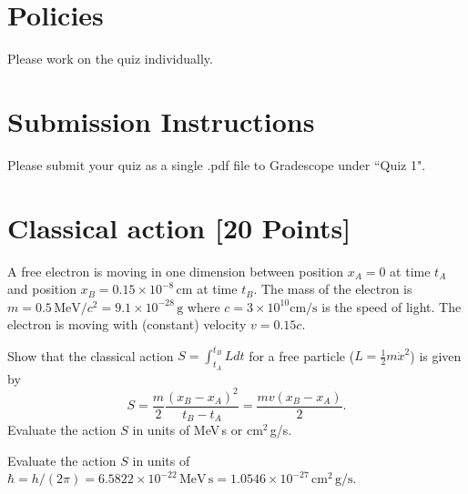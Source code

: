 \newif\ifshowsolutions
\showsolutionsfalse




\pagestyle{fancy}


\section*{Policies}
Please work on the quiz individually.

\section*{Submission Instructions}
Please submit your quiz as a single .pdf file to Gradescope under ``Quiz 1".

\section{Classical action [20 Points]}
A free electron is moving in one dimension between position $x_A=0$ at time $t_A$ and position $x_B=0.15\times 10^{-8}\,\mathrm{cm}$ at time $t_B$.
The mass of the electron is $m=0.5\,\mathrm{MeV}/c^2 = 9.1\times10^{-28}\,\mathrm{g}$ where $c=3\times10^{10}\mathrm{cm/s}$ is the speed of light.
The electron is moving with (constant) velocity $v=0.15c$.

\begin{problem}[10]
Show that the classical action $S = \int_{t_A}^{t_B} L dt$ for a free particle ($L = \frac{1}{2}m\dot{x}^2$) is given by
\begin{equation}
  S = \frac{m}{2}\frac{(x_B-x_A)^2}{t_B-t_A} =  \frac{mv(x_B-x_A)}{2}.
\end{equation}
Evaluate the action $S$ in units of MeV\,s or cm$^2$\,g/s.
\end{problem}

\begin{solution}

\end{solution}

\begin{problem}[5]
Evaluate the action $S$ in units of $\hbar = h/(2\pi) = 6.5822\times10^{-22}\,\mathrm{MeV\,s} = 1.0546 \times 10^{-27}\,\mathrm{cm}^2\,\mathrm{g/s}$.
\end{problem}

